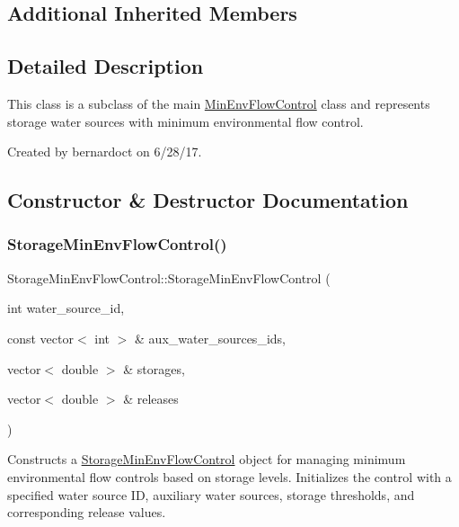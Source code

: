 \subsection*{Additional Inherited Members}


\subsection{Detailed Description}
This class is a subclass of the main {\ttfamily \mbox{\hyperlink{classMinEnvFlowControl}{Min\+Env\+Flow\+Control}}} class and represents storage water sources with minimum environmental flow control. 

Created by bernardoct on 6/28/17. 

\subsection{Constructor \& Destructor Documentation}
\mbox{\label{classStorageMinEnvFlowControl_aba965c28890bf5abb1230dd6d8879f18}} 
\subsubsection{\texorpdfstring{Storage\+Min\+Env\+Flow\+Control()}{StorageMinEnvFlowControl()}\hspace{0.1cm}{\footnotesize\ttfamily [1/2]}}
{\footnotesize\ttfamily Storage\+Min\+Env\+Flow\+Control\+::\+Storage\+Min\+Env\+Flow\+Control (\begin{DoxyParamCaption}\item[{int}]{water\+\_\+source\+\_\+id,  }\item[{const vector$<$ int $>$ \&}]{aux\+\_\+water\+\_\+sources\+\_\+ids,  }\item[{vector$<$ double $>$ \&}]{storages,  }\item[{vector$<$ double $>$ \&}]{releases }\end{DoxyParamCaption})}



Constructs a {\ttfamily \mbox{\hyperlink{classStorageMinEnvFlowControl}{Storage\+Min\+Env\+Flow\+Control}}} object for managing minimum environmental flow controls based on storage levels. Initializes the control with a specified water source ID, auxiliary water sources, storage thresholds, and corresponding release values. 


